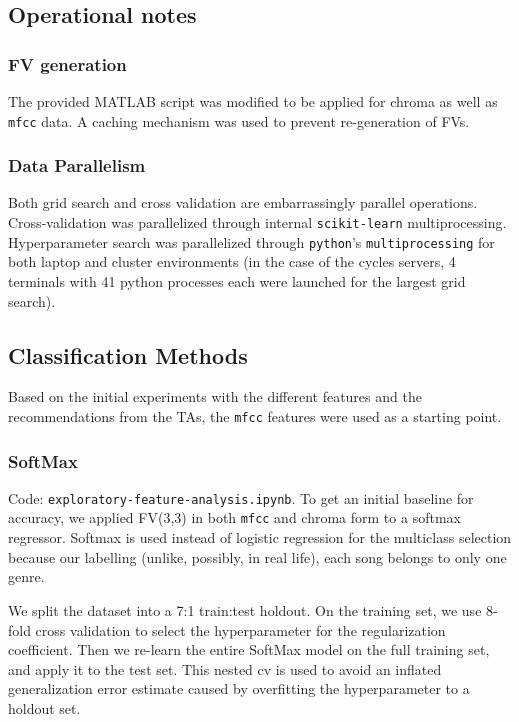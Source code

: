 \documentclass{article}
\begin{document}
\subsection{Operational notes}

\subsubsection{FV generation}

The provided MATLAB script was modified to be applied for chroma as well as \texttt{mfcc} data. A caching mechanism was used to prevent re-generation of FVs.

\subsubsection{Data Parallelism}

Both grid search and cross validation are embarrassingly parallel operations. Cross-validation was parallelized through internal \texttt{scikit-learn} multiprocessing. Hyperparameter search was parallelized through \texttt{python}'s \texttt{multiprocessing} for both laptop and cluster environments (in the case of the cycles servers, 4 terminals with 41 python processes each were launched for the largest grid search).

\subsection{Classification Methods}

Based on the initial experiments with the different features and the recommendations from the TAs, the \texttt{mfcc} features were used as a starting point.

\subsubsection{SoftMax}

Code: \texttt{exploratory-feature-analysis.ipynb}. To get an initial baseline for accuracy, we applied FV(3,3) in both \texttt{mfcc} and chroma form to a softmax regressor. Softmax is used instead of logistic regression for the multiclass selection because our labelling (unlike, possibly, in real life), each song belongs to only one genre.

We split the dataset into a 7:1 train:test holdout. On the training set, we use 8-fold cross validation to select the hyperparameter for the regularization coefficient. Then we re-learn the entire SoftMax model on the full training set, and apply it to the test set. This nested cv is used to avoid an inflated generalization error estimate caused by overfitting the hyperparameter to a holdout set.
\end{document}
